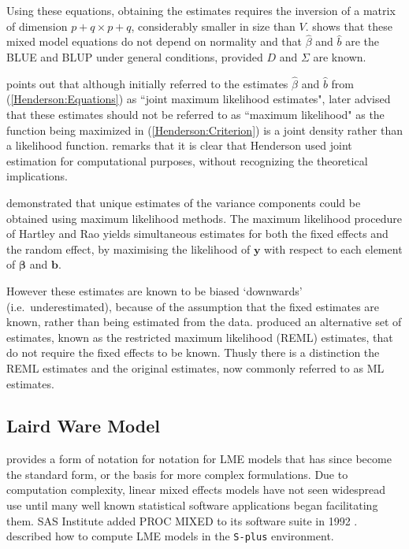 \documentclass[12pt, a4paper]{report}
\theoremstyle{plain}
\theoremstyle{definition}
\theoremstyle{remark}
\begin{document}
		Using these equations, obtaining the estimates requires the inversion of a matrix
		of dimension $p+q \times p+q$, considerably smaller in size than $V$. \citet{Henderson63} shows that these mixed model equations do not depend on normality and that $\hat{\beta}$ and $\hat{b}$ are the BLUE and BLUP under general conditions, provided $D$ and $\Sigma$ are known.
		
		\cite{Robi:BLUP:1991} points out that although \cite{Henderson:1950} initially referred to the estimates $\hat{\beta}$ and $\hat{b}$ from (\ref{Henderson:Equations}) as ``joint maximum likelihood estimates", \cite{Henderson:1973} later advised that these estimates should not be referred to as ``maximum likelihood" as the function being maximized in (\ref{Henderson:Criterion}) is a joint density rather than a likelihood function. \cite{YLee} remarks that it is clear that Henderson used joint estimation for computational purposes, without recognizing the theoretical implications.
		
		
	
	\citet{HartleyRao} demonstrated that unique estimates of the variance components could be obtained using maximum likelihood methods. The maximum likelihood procedure of Hartley and Rao yields simultaneous estimates for both the fixed effects and the random effect, by maximising the likelihood of $\boldsymbol{y}$ with respect to each element of $\boldsymbol{\beta}$ and $\boldsymbol{b}$.
		
	
	However these estimates are known to be biased `downwards' (i.e.\ underestimated), because of the assumption that the fixed estimates are known, rather than being estimated from the data. \citet{PattersonThompson} produced an alternative set of estimates, known as the restricted maximum likelihood (REML) estimates, that do not require the fixed effects to be known. Thusly there is a distinction the REML estimates and the original estimates, now commonly referred to as ML estimates.
	
	
	
	\subsection{Laird Ware Model} 
	\citet{LW82} provides a form of notation for notation for LME models that has since become the standard form, or the basis for more complex formulations. Due to computation complexity, linear mixed effects models have not seen widespread use until many well known statistical software applications began facilitating them. SAS Institute added PROC MIXED to its software suite in 1992 \citep{singer}. \citet{PB} described how to compute LME models in the \texttt{S-plus} environment.
	
\end{document}
